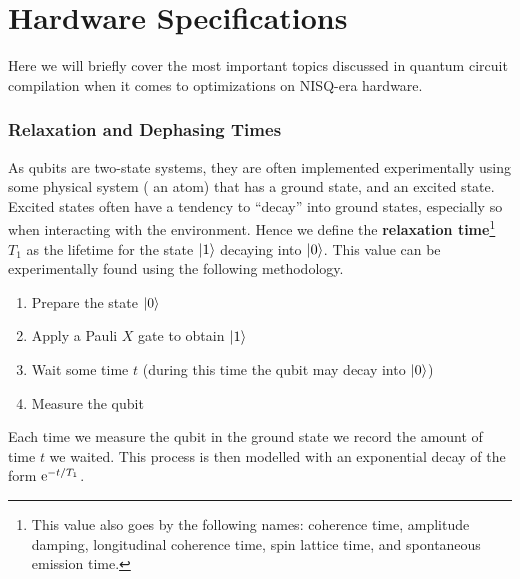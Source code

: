 \section{Hardware Specifications}

Here we will briefly cover the most important topics discussed in quantum circuit compilation when it comes to optimizations on \ac{NISQ}-era hardware.

\subsubsection{Relaxation and Dephasing Times}\label{sec:Ttimes}

As qubits are two-state systems, they are often implemented experimentally using some physical system (\eg{} an atom) that has a ground state, and an excited state.
Excited states often have a tendency to ``decay'' into ground states, especially so when interacting with the environment.
Hence we define the \textbf{relaxation time}\footnote{This value also goes by the following names: coherence time, amplitude damping, longitudinal coherence time, spin lattice time, and spontaneous emission time.} $T_1$ as the lifetime for the state $\ket{1}$ decaying into $\ket{0}$.
This value can be experimentally found using the following methodology.
\begin{enumerate}
    \item Prepare the state $\ket{0}$
    \item Apply a Pauli $X$ gate to obtain $\ket{1}$
    \item Wait some time $t$ (during this time the qubit may decay into $\ket{0}$)
    \item Measure the qubit
\end{enumerate}
Each time we measure the qubit in the ground state we record the amount of time $t$ we waited.
This process is then modelled with an exponential decay of the form $\mathrm{e}^{-t/T_1}$.

